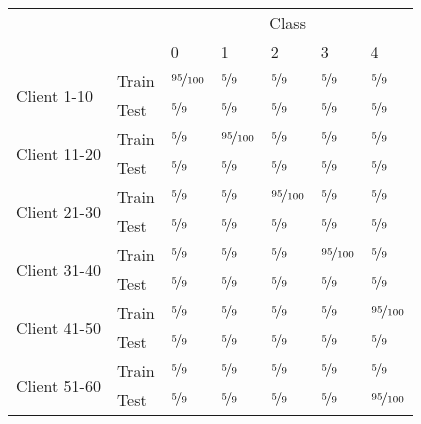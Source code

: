 \begin{tabular}{lllllll}
\toprule
              &      & \multicolumn{5}{c}{Class} \\
              &      & 0 & 1 & 2 & 3 & 4 \\
\midrule
\multirow{2}{*}{Client 1-10} & Train & $\nicefrac{{95}}{{100}}$ & $\nicefrac{{5}}{{9}}$ & $\nicefrac{{5}}{{9}}$ & $\nicefrac{{5}}{{9}}$ & $\nicefrac{{5}}{{9}}$ \\
              & Test & $\nicefrac{{5}}{{9}}$ & $\nicefrac{{5}}{{9}}$ & $\nicefrac{{5}}{{9}}$ & $\nicefrac{{5}}{{9}}$ & $\nicefrac{{5}}{{9}}$ \\
\cline{1-7}
\multirow{2}{*}{Client 11-20} & Train & $\nicefrac{{5}}{{9}}$ & $\nicefrac{{95}}{{100}}$ & $\nicefrac{{5}}{{9}}$ & $\nicefrac{{5}}{{9}}$ & $\nicefrac{{5}}{{9}}$ \\
              & Test & $\nicefrac{{5}}{{9}}$ & $\nicefrac{{5}}{{9}}$ & $\nicefrac{{5}}{{9}}$ & $\nicefrac{{5}}{{9}}$ & $\nicefrac{{5}}{{9}}$ \\
\cline{1-7}
\multirow{2}{*}{Client 21-30} & Train & $\nicefrac{{5}}{{9}}$ & $\nicefrac{{5}}{{9}}$ & $\nicefrac{{95}}{{100}}$ & $\nicefrac{{5}}{{9}}$ & $\nicefrac{{5}}{{9}}$ \\
              & Test & $\nicefrac{{5}}{{9}}$ & $\nicefrac{{5}}{{9}}$ & $\nicefrac{{5}}{{9}}$ & $\nicefrac{{5}}{{9}}$ & $\nicefrac{{5}}{{9}}$ \\
\cline{1-7}
\multirow{2}{*}{Client 31-40} & Train & $\nicefrac{{5}}{{9}}$ & $\nicefrac{{5}}{{9}}$ & $\nicefrac{{5}}{{9}}$ & $\nicefrac{{95}}{{100}}$ & $\nicefrac{{5}}{{9}}$ \\
              & Test & $\nicefrac{{5}}{{9}}$ & $\nicefrac{{5}}{{9}}$ & $\nicefrac{{5}}{{9}}$ & $\nicefrac{{5}}{{9}}$ & $\nicefrac{{5}}{{9}}$ \\
\cline{1-7}
\multirow{2}{*}{Client 41-50} & Train & $\nicefrac{{5}}{{9}}$ & $\nicefrac{{5}}{{9}}$ & $\nicefrac{{5}}{{9}}$ & $\nicefrac{{5}}{{9}}$ & $\nicefrac{{95}}{{100}}$ \\
              & Test & $\nicefrac{{5}}{{9}}$ & $\nicefrac{{5}}{{9}}$ & $\nicefrac{{5}}{{9}}$ & $\nicefrac{{5}}{{9}}$ & $\nicefrac{{5}}{{9}}$ \\
\cline{1-7}
\multirow{2}{*}{Client 51-60} & Train & $\nicefrac{{5}}{{9}}$ & $\nicefrac{{5}}{{9}}$ & $\nicefrac{{5}}{{9}}$ & $\nicefrac{{5}}{{9}}$ & $\nicefrac{{5}}{{9}}$ \\
              & Test & $\nicefrac{{5}}{{9}}$ & $\nicefrac{{5}}{{9}}$ & $\nicefrac{{5}}{{9}}$ & $\nicefrac{{5}}{{9}}$ & $\nicefrac{{95}}{{100}}$ \\

\end{tabular}
